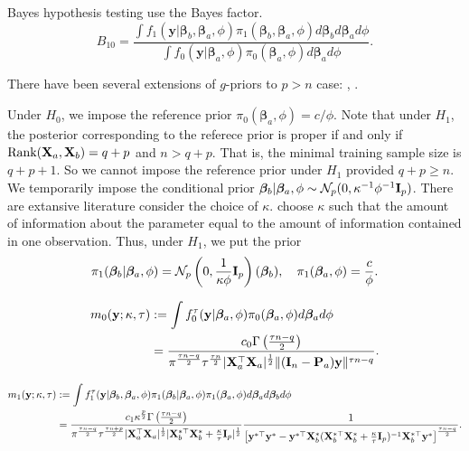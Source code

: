 \documentclass[11pt]{article}
\DeclareMathOperator{\myrank}{Rank}
\newcommand{\By}{\mathbf{y}}    \newcommand{\Bz}{\mathbf{z}}
\newcommand{\bfsym}[1]{\ensuremath{\boldsymbol{#1}}}
\def\bbeta{\bfsym \beta}
\theoremstyle{plain}
\theoremstyle{definition}
\theoremstyle{remark}
\begin{document}
Bayes hypothesis testing use the Bayes factor.
\begin{equation*}
    B_{10}= \frac {
        \int f_1(\By|\bbeta_b ,\bbeta_a, \phi) \pi_1(\bbeta_b,\bbeta_a,\phi) d\bbeta_b d\bbeta_a d\phi
}{
        \int f_0(\By|\bbeta_a, \phi) \pi_0(\bbeta_a,\phi) d\bbeta_a d\phi
    }.
\end{equation*}

There have been several extensions of $g$-priors to $p>n$ case: \cite{maruyama2011}, \cite{Shang2011}.

Under $H_0$, we impose the reference prior $\pi_0 (\bbeta_a,\phi)=c/\phi$.
Note that under $H_1$, the posterior corresponding to the referece prior is proper if and only if $\myrank (\BX_a, \BX_b)= q+p$ and $n>q + p$.
That is, the minimal training sample size is $q + p +1$.
So we cannot impose the reference prior under $ H_1$ provided $q + p  \geq n$.
We temporarily impose the conditional prior $\bbeta_b|\bbeta_a, \phi \sim \mathcal N_{p} (0, \kappa^{-1} \phi^{-1} \BI_{p}) $.
There are extansive literature consider the choice of $\kappa$.
\cite{Kass1995} choose $\kappa$ such that the amount of information about the parameter equal to the amount of information contained in one observation.
Thus, under $H_1$, we put the prior
\begin{equation*}
    \pi_1 (\bbeta_b | \bbeta_a, \phi) =
    \mathcal N_p\left(0,\frac{1}{\kappa \phi}\BI_p\right)(\bbeta_b)
    ,\quad
    \pi_1(\bbeta_a, \phi) = \frac{c}{\phi}.
\end{equation*}

\begin{equation*}
    \begin{split}
    m_0(\By;\kappa, \tau) 
    &:=
    \int f_0^\tau (\By|\bbeta_a,\phi) \pi_0 (\bbeta_a, \phi) d\bbeta_a d\phi
    \\
    &=
    \frac{
        c_0 \Gamma\left( \frac{\tau n - q}{2}\right)
    }{
        \pi^{\frac{\tau n - q }{2}}
        \tau^{\frac{\tau n}{2}}
        |\BX_a^\top \BX_a|^{\frac{1}{2}}
        \| (\BI_n -\BP_a) \By\|^{\tau n -q}
    }.
    \end{split}
\end{equation*}

\begin{equation*}
    \begin{split}
        m_1(\By;\kappa, \tau) 
    &:=
    \int f_1^\tau (\By|\bbeta_b,\bbeta_a,\phi) \pi_1 (\bbeta_b |\bbeta_a, \phi) \pi_1 (\bbeta_a, \phi)  d\bbeta_a d\bbeta_b d\phi
    \\
    &=
    \frac{c_1\kappa^{\frac p 2} \Gamma \left(\frac{\tau n -q}{2}\right)}{
        \pi^{\frac{\tau n -q}{ 2 }} \tau^{\frac{\tau n + p}{2}}
        |\BX_a^\top \BX_a|^{\frac 1 2}
        |\BX_b^{*\top} \BX_b^* + \frac{\kappa}{\tau } \BI_p|^{\frac 1 2}
    }
    \frac{1}{\left[ \By^{*\top} \By^* - \By^{*\top} \BX_b^* ( \BX_b^{*\top}\BX_b^* + \frac{\kappa}{\tau} \BI_p )^{-1} \BX_b^{*\top} \By^* \right]^{\frac{\tau n - q}{2}}}
    .
    \end{split}
\end{equation*}
\end{document}
